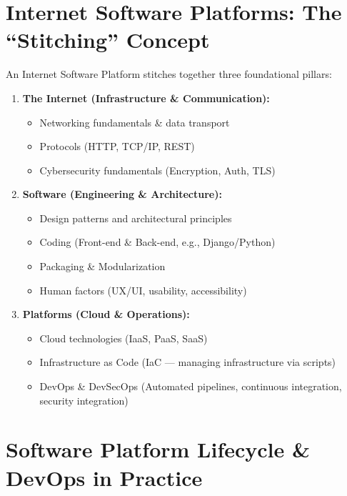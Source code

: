 \documentclass[8pt, a4paper]{article}
\begin{document}
\section{Internet Software Platforms: The ``Stitching'' Concept}

An Internet Software Platform stitches together three foundational pillars:

\begin{enumerate}
  \item \textbf{The Internet (Infrastructure \& Communication):}
  \begin{itemize}
    \item Networking fundamentals \& data transport
    \item Protocols (HTTP, TCP/IP, REST)
    \item Cybersecurity fundamentals (Encryption, Auth, TLS)
  \end{itemize}

  \item \textbf{Software (Engineering \& Architecture):}
  \begin{itemize}
    \item Design patterns and architectural principles
    \item Coding (Front-end \& Back-end, e.g., Django/Python)
    \item Packaging \& Modularization
    \item Human factors (UX/UI, usability, accessibility)
  \end{itemize}

  \item \textbf{Platforms (Cloud \& Operations):}
  \begin{itemize}
    \item Cloud technologies (IaaS, PaaS, SaaS)
    \item Infrastructure as Code (IaC --- managing infrastructure via scripts)
    \item DevOps \& DevSecOps (Automated pipelines, continuous integration, security integration)
  \end{itemize}
\end{enumerate}

\section{Software Platform Lifecycle \& DevOps in Practice}
\end{document}
